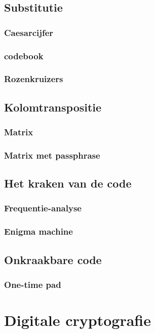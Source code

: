 \documentclass[a4paper,12pt,twoside,openright,titlepage]{book}
\begin{document}
\section{Substitutie}

\subsection{Caesarcijfer}

\subsection{codebook}

\subsection{Rozenkruizers}

\section{Kolomtranspositie}
\subsection{Matrix}

\subsection{Matrix met passphrase}

\section{Het kraken van de code}
\subsection{Frequentie-analyse}

\subsection{Enigma machine}

\section{Onkraakbare code}
\subsection{One-time pad}


\chapter{Digitale cryptografie}
\end{document}
